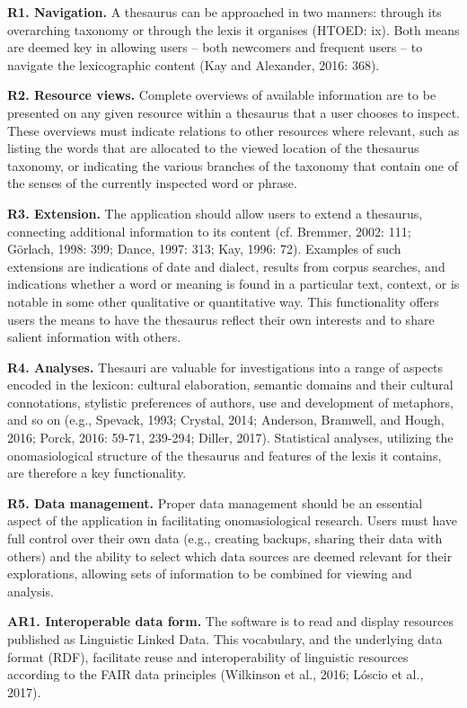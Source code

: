 \textbf{R1. Navigation.} A thesaurus can be approached in two manners: through its overarching taxonomy or through the lexis it organises (HTOED: ix). Both means are deemed key in allowing users – both newcomers and frequent users – to navigate the lexicographic content (Kay and Alexander, 2016: 368). 

\textbf{R2. Resource views.} Complete overviews of available information are to be presented on any given resource within a thesaurus that a user chooses to inspect. These overviews must indicate relations to other resources where relevant, such as listing the words that are allocated to the viewed location of the thesaurus taxonomy, or indicating the various branches of the taxonomy that contain one of the senses of the currently inspected word or phrase.

\textbf{R3. Extension.} The application should allow users to extend a thesaurus, connecting additional information to its content (cf. Bremmer, 2002: 111; Görlach, 1998: 399; Dance, 1997: 313; Kay, 1996: 72). Examples of such extensions are indications of date and dialect, results from corpus searches, and indications whether a word or meaning is found in a particular text, context, or is notable in some other qualitative or quantitative way. This functionality offers users the means to have the thesaurus reflect their own interests and to share salient information with others.

\textbf{R4. Analyses.} Thesauri are valuable for investigations into a range of aspects encoded in the lexicon: cultural elaboration, semantic domains and their cultural connotations, stylistic preferences of authors, use and development of metaphors, and so on (e.g., Spevack, 1993; Crystal, 2014; Anderson, Bramwell, and Hough, 2016; Porck, 2016: 59-71, 239-294; Diller, 2017). Statistical analyses, utilizing the onomasiological structure of the thesaurus and features of the lexis it contains, are therefore a key functionality.

\textbf{R5. Data management.} Proper data management should be an essential aspect of the application in facilitating onomasiological research. Users must have full control over their own data (e.g., creating backups, sharing their data with others) and the ability to select which data sources are deemed relevant for their explorations, allowing sets of information to be combined for viewing and analysis.

\textbf{AR1. Interoperable data form.} The software is to read and display resources published as Linguistic Linked Data. This vocabulary, and the underlying data format (RDF), facilitate reuse and interoperability of linguistic resources according to the FAIR data principles (Wilkinson et al., 2016; Lóscio et al., 2017). 

